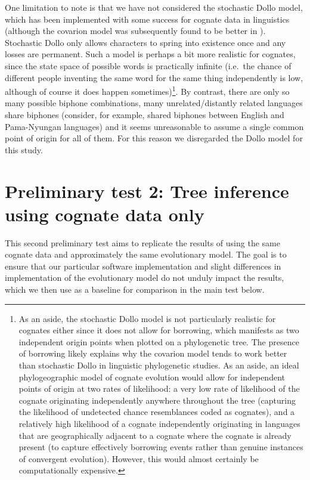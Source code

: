 \documentclass[]{article}
\begin{document}
One limitation to note is that we have not considered the stochastic Dollo model, which has been implemented with some success for cognate data in linguistics \autocite{bowern_computational_2012} (although the covarion model was subsequently found to be better in \textcite{bouckaert_origin_2018}). Stochastic Dollo only allows characters to spring into existence once and any losses are permanent. Such a model is perhaps a bit more realistic for cognates, since the state space of possible words is practically infinite (i.e.~the chance of different people inventing the same word for the same thing independently is low, although of course it does happen sometimes)\footnote{As an aside, the stochastic Dollo model is not particularly realistic for cognates either since it does not allow for borrowing, which manifests as two independent origin points when plotted on a phylogenetic tree. The presence of borrowing likely explains why the covarion model tends to work better than stochastic Dollo in linguistic phylogenetic studies. As an aside, an ideal phylogeographic model of cognate evolution would allow for independent points of origin at two rates of likelihood: a very low rate of likelihood of the cognate originating independently anywhere throughout the tree (capturing the likelihood of undetected chance resemblances coded as cognates), and a relatively high likelihood of a cognate independently originating in languages that are geographically adjacent to a cognate where the cognate is already present (to capture effectively borrowing events rather than genuine instances of convergent evolution). However, this would almost certainly be computationally expensive.}. By contrast, there are only so many possible biphone combinations, many unrelated/distantly related languages share biphones (consider, for example, shared biphones between English and Pama-Nyungan languages) and it seems unreasonable to assume a single common point of origin for all of them. For this reason we disregarded the Dollo model for this study.

\hypertarget{prelim-2}{%
\section{Preliminary test 2: Tree inference using cognate data only}\label{prelim-2}}

This second preliminary test aims to replicate the results of \textcite{bouckaert_origin_2018} using the same cognate data and approximately the same evolutionary model. The goal is to ensure that our particular software implementation and slight differences in implementation of the evolutionary model do not unduly impact the results, which we then use as a baseline for comparison in the main test below.
\end{document}
